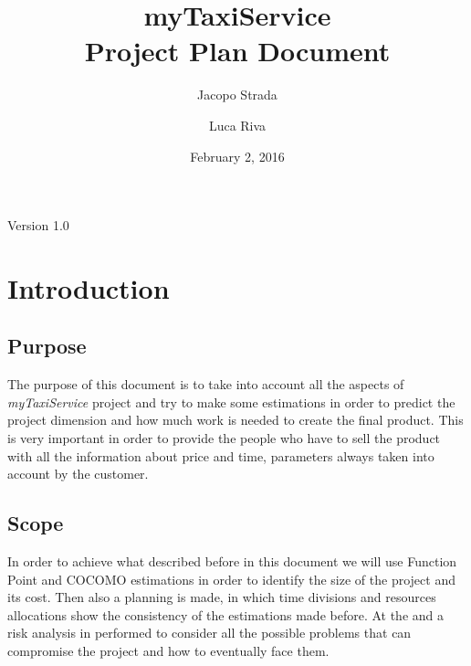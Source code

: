 \documentclass[a4paper]{article}
\title{{\Huge myTaxiService} \\ Project Plan Document}
\author{Jacopo Strada \and Luca Riva}
\date{February 2, 2016}
\begin{document}
\maketitle
\vfill
\begin{flushright}
Version 1.0
\end{flushright}

\newpage

\tableofcontents

\vfill

\listoffigures

\vfill

\listoftables

\vfill


\let\stdsection\section
\renewcommand\section{\newpage\stdsection}

\setlength{\parindent}{0em}
\setlength{\parskip}{1em}

\section{Introduction}

\subsection{Purpose}
The purpose of this document is to take into account all the aspects of \emph{myTaxiService} project and try to make some estimations in order to predict the project dimension and how much work is needed to create the final product. This is very important in order to provide the people who have to sell the product with all the information about price and time, parameters always taken into account by the customer.

\subsection{Scope} 
In order to achieve what described before in this document we will use Function Point and COCOMO estimations in order to identify the size of the project and its cost.
Then also a planning is made, in which time divisions and resources allocations show the consistency of the estimations made before.
At the and a risk analysis in performed to consider all the possible problems that can compromise the project and how to eventually face them.
\end{document}
